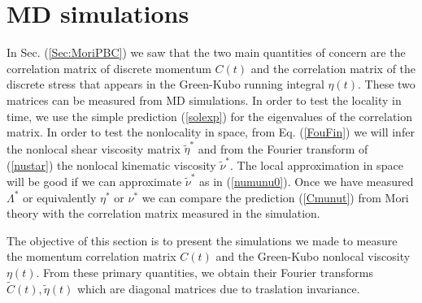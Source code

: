 \documentclass[a4paper,openright,12pt]{book}
\begin{document}


\section{MD simulations}
\label{Sec:SimPBC}
In Sec. (\ref{Sec:MoriPBC}) we saw that the  two main  quantities of  concern  are the  correlation matrix  of
discrete momentum  $C(t)$ and the  correlation matrix of  the discrete
stress  that appears  in  the Green-Kubo  running integral  $\eta(t)$.
These two  matrices can be measured  from MD simulations. In  order to
test the locality in time, we use the simple prediction (\ref{solexp})
for the  eigenvalues of the correlation  matrix. In order to  test the
nonlocality  in space,  from Eq.   (\ref{FouFin}) we  will infer  the
nonlocal shear viscosity matrix  $\tilde{\eta}^*$ and from the Fourier
transform   of  (\ref{nustar})   the  nonlocal   kinematic  viscosity
$\tilde{\nu}^*$. The local  approximation in space will be  good if we
can approximate  $\tilde{\nu}^*$ as in (\ref{numunu0}).   Once we have
measured  $\Lambda^*$  or  equivalently  $\eta^*$ or  $\nu^*$  we  can
compare  the  prediction  (\ref{Cmunut})  from Mori  theory  with  the
correlation matrix measured in the simulation.

The objective of this section is to present the simulations we made to measure the
momentum  correlation  matrix  $C(t)$  and  the  Green-Kubo  nonlocal
viscosity $\eta(t)$.   From these primary quantities,  we obtain their
Fourier transforms  $\tilde{C}(t),\tilde{\eta}(t)$ which  are diagonal
matrices  due to  traslation invariance.  
\end{document}
